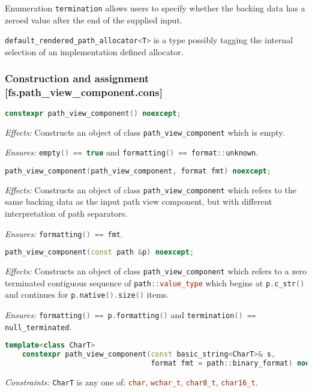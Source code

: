 \documentclass[11pt]{article}
\newcommand{\code}[2][cpp]{\lstinline[language=#1,basicstyle=\small\ttfamily]{#2}}
\newcommand{\desc}[1]{\textit{#1}}
\newcommand{\constraints}{\desc{Constraints: }}
\newcommand{\effects}{\desc{Effects: }}
\newcommand{\ensures}{\desc{Ensures: }}
\begin{document}
Enumeration \code{termination} allows users to specify whether the backing data has a zeroed value after the end of the supplied input.

\code{default_rendered_path_allocator<T>} is a type possibly tagging the internal selection of an implementation defined allocator.

\subsubsection*{Construction and assignment [fs.path\_view\_component.cons]}

\begin{lstlisting}[language=cpp]
   constexpr path_view_component() noexcept;
\end{lstlisting}

\effects Constructs an object of class \code{path_view_component} which is empty.

\ensures \code{empty() == true} and \code{formatting() == format::unknown}.\\

\begin{lstlisting}[language=cpp]
    path_view_component(path_view_component, format fmt) noexcept;
\end{lstlisting}

\effects Constructs an object of class \code{path_view_component} which refers to the same backing data as the input path view component, but with different interpretation of path separators.

\ensures \code{formatting() == fmt}.\\

\begin{lstlisting}[language=cpp]
    path_view_component(const path &p) noexcept;
\end{lstlisting}

\effects Constructs an object of class \code{path_view_component} which refers to a zero terminated contiguous sequence of \code{path::value_type} which begins at \code{p.c_str()} and continues for \code{p.native().size()} items.

\ensures \code{formatting() == p.formatting()} and \code{termination() == null_terminated}.\\

\begin{lstlisting}[language=cpp]
    template<class CharT>
    constexpr path_view_component(const basic_string<CharT>& s,
                                  format fmt = path::binary_format) noexcept;
\end{lstlisting}
\constraints \code{CharT} is any one of: \code{char}, \code{wchar_t}, \code{char8_t}, \code{char16_t}.
\end{document}
